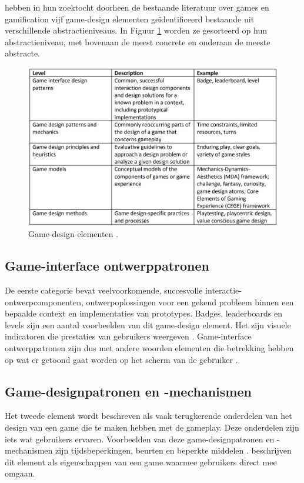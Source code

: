 \textcite{Deterding20112} hebben in hun zoektocht doorheen de bestaande literatuur over games en gamification vijf game-design elementen geïdentificeerd bestaande uit verschillende abstractieniveaus. In Figuur \ref{fig:table1} worden ze gesorteerd op hun abstractieniveau, met bovenaan de meest concrete en onderaan de meeste abstracte.

\begin{figure}
    \includegraphics[width=\linewidth]{Deterding2011Table.png}
    \caption{Game-design elementen \autocite{Deterding20112}.}
    \label{fig:table1}
\end{figure}

\subsection{Game-interface ontwerppatronen}

De eerste categorie bevat veelvoorkomende, succesvolle interactie-ontwerpcomponenten, ontwerpoplossingen voor een gekend probleem binnen een bepaalde context en implementaties van prototypes. Badges, leaderboards en levels zijn een aantal voorbeelden van dit game-design element. Het zijn visuele indicatoren die prestaties van gebruikers weergeven \autocite{Morford2014}. Game-interface ontwerppatronen zijn dus met andere woorden elementen die betrekking hebben op wat er getoond gaat worden op het scherm van de gebruiker \autocite{Lindholm2016}.

\subsection{Game-designpatronen en -mechanismen}

Het tweede element wordt beschreven als vaak terugkerende onderdelen van het design van een game die te maken hebben met de gameplay. Deze onderdelen zijn iets wat gebruikers ervaren. Voorbeelden van deze game-designpatronen en -mechanismen zijn tijdsbeperkingen, beurten en beperkte middelen \autocite{Lindholm2016}. \textcite{Morford2014} beschrijven dit element als eigenschappen van een game waarmee gebruikers direct mee omgaan.

